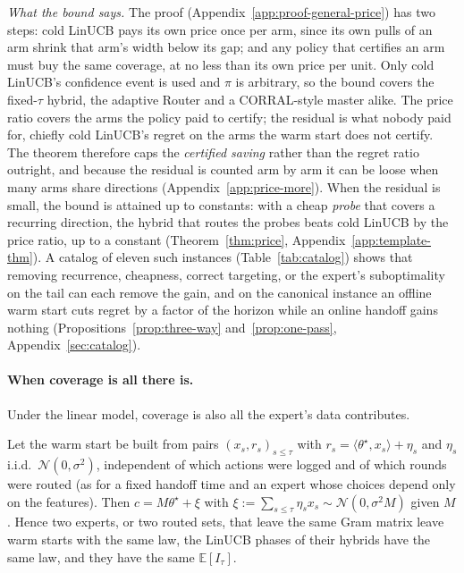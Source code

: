 \documentclass[anon]{alt2027} %
\newcommand{\E}{\mathbb{E}}
\begin{document}
\emph{What the bound says.} The proof (Appendix~\ref{app:proof-general-price})
has two steps: cold LinUCB pays its own price once per arm, since its own
pulls of an arm shrink that arm's width below its gap; and any policy that
certifies an arm must buy the same coverage, at no less than its own price
per unit. Only cold LinUCB's confidence event is used and $\pi$ is
arbitrary, so the bound covers the fixed-$\tau$ hybrid, the adaptive Router
and a CORRAL-style master alike. The price ratio covers the arms the policy
paid to certify; the residual is what nobody paid for, chiefly cold LinUCB's
regret on the arms the warm start does not certify. The theorem therefore
caps the \emph{certified saving} rather than the regret ratio outright, and
because the residual is counted arm by arm it can be loose when many arms
share directions (Appendix~\ref{app:price-more}). When the residual is small,
the bound is attained up to constants: with a cheap \emph{probe} that covers
a recurring direction, the hybrid that routes the probes beats cold LinUCB by
the price ratio, up to a constant (Theorem~\ref{thm:price},
Appendix~\ref{app:template-thm}). A catalog of
eleven such instances (Table~\ref{tab:catalog}) shows that removing
recurrence, cheapness, correct targeting, or the expert's suboptimality on
the tail can each remove the gain, and on the canonical instance an offline
warm start cuts regret by a factor of the horizon while an online handoff
gains nothing (Propositions~\ref{prop:three-way} and~\ref{prop:one-pass},
Appendix~\ref{sec:catalog}).

\paragraph{When coverage is all there is.}
Under the linear model, coverage is also all the expert's data contributes.

\begin{observation}
\label{prop:response-sum}
\label{cor:coverage-complete}
Let the warm start be built from pairs $(x_s,r_s)_{s\le\tau}$ with
$r_s=\langle\theta^\star,x_s\rangle+\eta_s$ and $\eta_s$ i.i.d.\
$\mathcal N(0,\sigma^2)$, independent of which actions were logged and of
which rounds were routed (as for a fixed handoff time and an expert whose
choices depend only on the features). Then $c=M\theta^\star+\xi$ with
$\xi:=\sum_{s\le\tau}\eta_sx_s\sim\mathcal N(0,\sigma^2M)$ given $M$. Hence two
experts, or two routed sets, that leave the same Gram matrix leave warm
starts with the same law, the LinUCB phases of their hybrids have the same
law, and they have the same $\E[I_\tau]$.
\end{observation}
\end{document}
